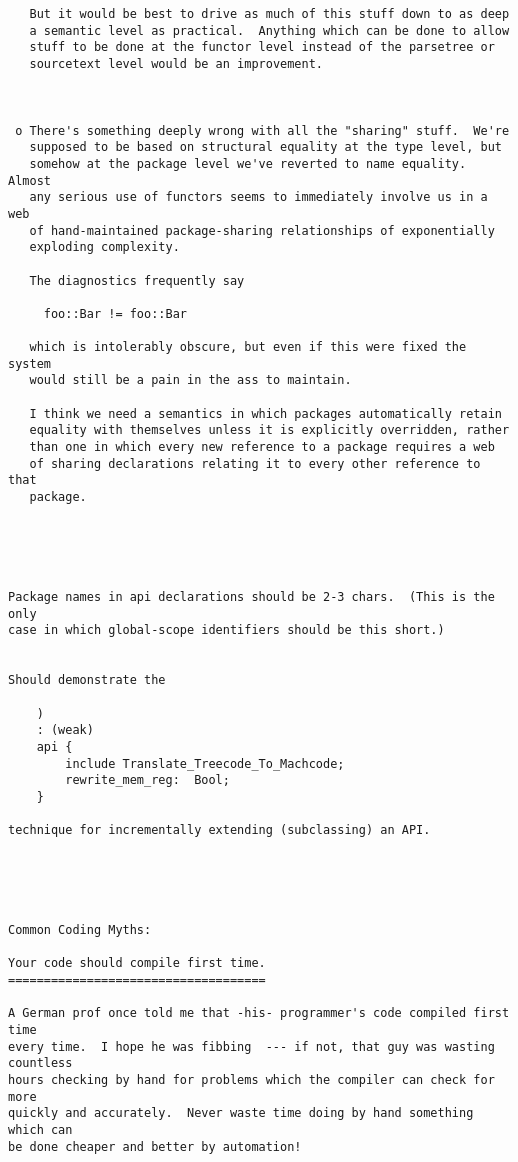 \begin{verbatim}
   But it would be best to drive as much of this stuff down to as deep 
   a semantic level as practical.  Anything which can be done to allow 
   stuff to be done at the functor level instead of the parsetree or 
   sourcetext level would be an improvement. 



 o There's something deeply wrong with all the "sharing" stuff.  We're 
   supposed to be based on structural equality at the type level, but 
   somehow at the package level we've reverted to name equality.  Almost 
   any serious use of functors seems to immediately involve us in a web 
   of hand-maintained package-sharing relationships of exponentially 
   exploding complexity. 

   The diagnostics frequently say 

     foo::Bar != foo::Bar 

   which is intolerably obscure, but even if this were fixed the system 
   would still be a pain in the ass to maintain. 

   I think we need a semantics in which packages automatically retain 
   equality with themselves unless it is explicitly overridden, rather 
   than one in which every new reference to a package requires a web 
   of sharing declarations relating it to every other reference to that 
   package. 





Package names in api declarations should be 2-3 chars.  (This is the only 
case in which global-scope identifiers should be this short.) 


Should demonstrate the 

    ) 
    : (weak) 
    api { 
        include Translate_Treecode_To_Machcode; 
        rewrite_mem_reg:  Bool; 
    }

technique for incrementally extending (subclassing) an API. 





Common Coding Myths: 

Your code should compile first time. 
==================================== 

A German prof once told me that -his- programmer's code compiled first time 
every time.  I hope he was fibbing  --- if not, that guy was wasting countless 
hours checking by hand for problems which the compiler can check for more 
quickly and accurately.  Never waste time doing by hand something which can 
be done cheaper and better by automation! 


\end{verbatim}
